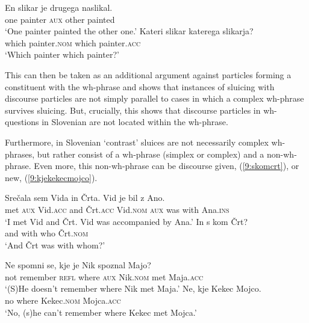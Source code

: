 \documentclass[output=paper,
modfonts,
newtxmath,
hidelinks
]{langscibook}
\begin{document}
\begin{exe}
\ex \begin{xlist}
\ex \gll En slikar je drugega naslikal.\\
one painter \textsc{aux} other 	painted\\
\trans `One painter painted the other one.'	 
\ex \label{9:katerikaterega}
\gll	Kateri slikar katerega slikarja?\\
which painter.\textsc{nom} which painter.\textsc{acc}\\
\trans `Which painter which painter?'
\end{xlist}\end{exe}

\noindent This can then be taken as an additional argument against particles forming a constituent with the wh-phrase and shows that instances of sluicing with  discourse particles are not simply parallel to cases in which a complex wh-phrase survives sluicing. But, crucially, this shows that discourse particles in wh-questions in Slovenian are not located within the wh-phrase. 

Furthermore, in Slovenian `contrast' sluices are not necessarily complex wh-phrases, but rather consist of a wh-phrase (simplex or complex) and a non-wh-phrase. Even more, this non-wh-phrase can be discourse given, (\ref{9:skomcrt}), or new, (\ref{9:kjekekecmojco}).

\begin{exe}
\ex \begin{xlist}
\ex \gll Srečala sem Vida in Črta. Vid je bil z Ano.\\
met \textsc{aux} Vid.\textsc{acc} and Črt.\textsc{acc}  Vid.\textsc{nom} \textsc{aux} was with Ana.\textsc{ins} \\
\trans `I met Vid and Črt. Vid was accompanied by Ana.' 
\ex \gll In s kom Črt? \\
	and with who Črt.\textsc{nom}\\
\trans  `And Črt was with whom?'
\end{xlist}
\label{9:skomcrt}
\ex \begin{xlist}
\ex \gll	Ne spomni se, kje je Nik spoznal Majo? \\
not remember \textsc{refl} where \textsc{aux} Nik.\textsc{nom} met Maja.\textsc{acc}\\
\trans `(S)He doesn't remember where Nik met Maja.'
\ex \gll 	Ne, kje Kekec Mojco.\\
	no where Kekec.\textsc{nom} Mojca.\textsc{acc}\\
\trans 	 `No, (s)he can't remember where Kekec met Mojca.'
\end{xlist}
\label{9:kjekekecmojco}
\end{exe}
\end{document}
